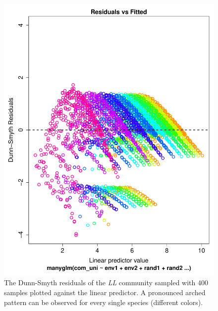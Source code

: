 \documentclass[a4paper,11pt]{article}
\begin{document}
    \begin{figure}[!htbp]
        \centering
        \includegraphics[scale = 0.4]{figures/arched_dunn_smyth.pdf}
        \caption{The Dunn-Smyth residuals of the \textit{LL} community sampled with 400 samples plotted against the linear predictor. A pronounced arched pattern can be observed for every single species (different colors).}
        \label{fig:arched_DS}
    \end{figure}{}
    
  
    
\end{document}
